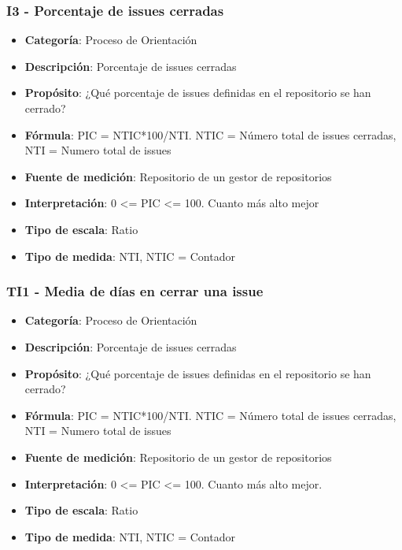 \subsubsection{I3 - Porcentaje de issues cerradas}
\begin{itemize}
	\item \textbf{Categoría}: Proceso de Orientación
	\item \textbf{Descripción}: Porcentaje de issues cerradas
	\item \textbf{Propósito}: ¿Qué porcentaje de issues definidas en el repositorio se han cerrado?
	\item \textbf{Fórmula}: PIC = NTIC*100/NTI. NTIC = Número total de issues cerradas, NTI = Numero total de issues
	\item \textbf{Fuente de medición}: Repositorio de un gestor de repositorios
	\item \textbf{Interpretación}: 0 <= PIC <= 100. Cuanto más alto mejor
	\item \textbf{Tipo de escala}: Ratio
	\item \textbf{Tipo de medida}: NTI, NTIC = Contador
\end{itemize}
\subsubsection{TI1 - Media de días en cerrar una issue}
\begin{itemize}
	\item \textbf{Categoría}: Proceso de Orientación
	\item \textbf{Descripción}: Porcentaje de issues cerradas
	\item \textbf{Propósito}: ¿Qué porcentaje de issues definidas en el repositorio se han cerrado? 
	\item \textbf{Fórmula}: PIC = NTIC*100/NTI. NTIC = Número total de issues cerradas, NTI = Numero total de issues
	\item \textbf{Fuente de medición}: Repositorio de un gestor de repositorios
	\item \textbf{Interpretación}: 0 <= PIC <= 100. Cuanto más alto mejor.
	\item \textbf{Tipo de escala}: Ratio
	\item \textbf{Tipo de medida}: NTI, NTIC = Contador
\end{itemize}
